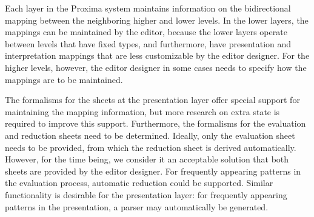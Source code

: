 Each layer in the Proxima system maintains information on the bidirectional mapping between the neighboring higher and lower levels. In the lower layers, the mappings can be maintained by the editor, because the lower layers operate between levels that have fixed types, and furthermore, have presentation and interpretation mappings that are less customizable by the editor designer. For the higher levels, however, the editor designer in some cases needs to specify how the mappings are to be maintained. 

The formalisms for the sheets at the presentation layer offer special support for maintaining the mapping information, but more research on extra state is required to improve this support. Furthermore, the formalisms for the evaluation and reduction sheets need to be determined. Ideally, only the evaluation sheet needs to be provided, from which the reduction sheet is derived automatically. However, for the time being, we consider it an acceptable solution that both sheets are provided by the editor designer. For frequently appearing patterns in the evaluation process, automatic reduction could be supported. Similar functionality is desirable for the presentation layer: for frequently appearing patterns in the presentation, a parser may automatically be generated.
 

